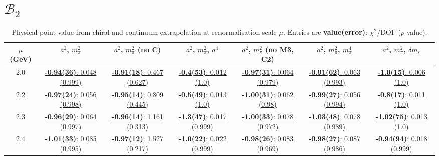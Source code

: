 \documentclass[12pt]{extarticle}
\begin{document}
\section{$\mathcal{B}_2$}
\begin{table}[h!]
\begin{center}
\begin{tabular}{|c|c|c|c|c|c|c|}
\hline
$\mu$ (GeV) & $a^2$, $m_\pi^2$& $a^2$, $m_\pi^2$ (no C)& $a^2$, $m_\pi^2$, $a^4$& $a^2$, $m_\pi^2$ (no M3, C2)& $a^2$, $m_\pi^2$, $m_\pi^4$& $a^2$, $m_\pi^2$, $\delta m_s$\\
\hline
2.0& \hyperlink{VVmAA/NPR/a2m2_20.pdf.1}{\textbf{-0.94(36)}: 0.048 (0.999)} & \hyperlink{VVmAA/NPR/a2m2noC_20.pdf.1}{\textbf{-0.91(18)}: 0.467 (0.627)} & \hyperlink{VVmAA/NPR/a2a4m2_20.pdf.1}{\textbf{-0.4(53)}: 0.012 (1.0)} & \hyperlink{VVmAA/NPR/a2m2mcut_20.pdf.1}{\textbf{-0.97(31)}: 0.064 (0.979)} & \hyperlink{VVmAA/NPR/a2m2m4_20.pdf.1}{\textbf{-0.91(62)}: 0.063 (0.993)} & \hyperlink{VVmAA/NPR/a2m2delm_20.pdf.1}{\textbf{-1.0(15)}: 0.006 (1.0)}\\
2.2& \hyperlink{VVmAA/NPR/a2m2_22.pdf.1}{\textbf{-0.97(24)}: 0.056 (0.998)} & \hyperlink{VVmAA/NPR/a2m2noC_22.pdf.1}{\textbf{-0.95(14)}: 0.809 (0.445)} & \hyperlink{VVmAA/NPR/a2a4m2_22.pdf.1}{\textbf{-0.5(49)}: 0.013 (1.0)} & \hyperlink{VVmAA/NPR/a2m2mcut_22.pdf.1}{\textbf{-1.00(31)}: 0.062 (0.98)} & \hyperlink{VVmAA/NPR/a2m2m4_22.pdf.1}{\textbf{-0.99(27)}: 0.056 (0.994)} & \hyperlink{VVmAA/NPR/a2m2delm_22.pdf.1}{\textbf{-0.8(17)}: 0.011 (1.0)}\\
2.3& \hyperlink{VVmAA/NPR/a2m2_23.pdf.1}{\textbf{-0.96(29)}: 0.064 (0.997)} & \hyperlink{VVmAA/NPR/a2m2noC_23.pdf.1}{\textbf{-0.96(14)}: 1.161 (0.313)} & \hyperlink{VVmAA/NPR/a2a4m2_23.pdf.1}{\textbf{-1.3(47)}: 0.017 (0.999)} & \hyperlink{VVmAA/NPR/a2m2mcut_23.pdf.1}{\textbf{-1.00(33)}: 0.078 (0.972)} & \hyperlink{VVmAA/NPR/a2m2m4_23.pdf.1}{\textbf{-1.03(48)}: 0.078 (0.989)} & \hyperlink{VVmAA/NPR/a2m2delm_23.pdf.1}{\textbf{-1.02(75)}: 0.013 (1.0)}\\
2.4& \hyperlink{VVmAA/NPR/a2m2_24.pdf.1}{\textbf{-1.01(33)}: 0.085 (0.995)} & \hyperlink{VVmAA/NPR/a2m2noC_24.pdf.1}{\textbf{-0.97(12)}: 1.527 (0.217)} & \hyperlink{VVmAA/NPR/a2a4m2_24.pdf.1}{\textbf{-1.0(22)}: 0.022 (0.999)} & \hyperlink{VVmAA/NPR/a2m2mcut_24.pdf.1}{\textbf{-0.98(26)}: 0.083 (0.969)} & \hyperlink{VVmAA/NPR/a2m2m4_24.pdf.1}{\textbf{-0.98(27)}: 0.087 (0.986)} & \hyperlink{VVmAA/NPR/a2m2delm_24.pdf.1}{\textbf{-0.94(94)}: 0.018 (0.999)}\\
\hline
\end{tabular}
\caption{Physical point value from chiral and continuum extrapolation at renormalisation scale $\mu$. Entries are \textbf{value(error)}: $\chi^2/\text{DOF}$ ($p$-value).}
\end{center}
\end{table}
\end{document}
